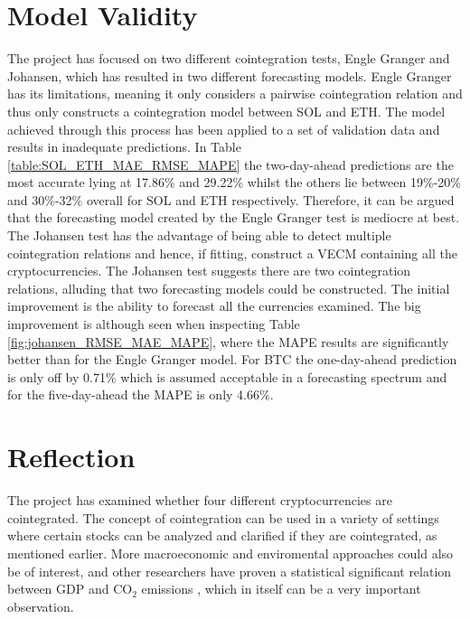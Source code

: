 \section{Model Validity}
The project has focused on two different cointegration tests, Engle Granger and Johansen, which has resulted in two different forecasting models. Engle Granger has its limitations, meaning it only considers a pairwise cointegration relation and thus only constructs a cointegration model between SOL and ETH. The model achieved through this process has been applied to a set of validation data and results in inadequate predictions. In Table \ref{table:SOL_ETH_MAE_RMSE_MAPE} the two-day-ahead predictions are the most accurate lying at 17.86\% and 29.22\% whilst the others lie between 19\%-20\% and 30\%-32\% overall for SOL and ETH respectively. Therefore, it can be argued that the forecasting model created by the Engle Granger test is mediocre at best.\\
The Johansen test has the advantage of being able to detect multiple cointegration relations and hence, if fitting, construct a VECM containing all the cryptocurrencies. The Johansen test suggests there are two cointegration relations, alluding that two forecasting models could be constructed. The initial improvement is the ability to forecast all the currencies examined. The big improvement is although seen when inspecting Table \ref{fig:johansen_RMSE_MAE_MAPE}, where the MAPE results are significantly better than for the Engle Granger model. For BTC the one-day-ahead prediction is only off by 0.71$\%$ which is assumed acceptable in a forecasting spectrum and for the five-day-ahead the MAPE is only 4.66$\%$.

\section{Reflection}
The project has examined whether four different cryptocurrencies are cointegrated. The concept of cointegration can be used in a variety of settings where certain stocks can be analyzed and clarified if they are cointegrated, as mentioned earlier. More macroeconomic and enviromental approaches could also be of interest, and other researchers have proven a statistical significant relation between GDP and CO$_2$ emissions \cite{A_Cointegration_Analysis_of_Real_GDP}, which in itself can be a very important observation.